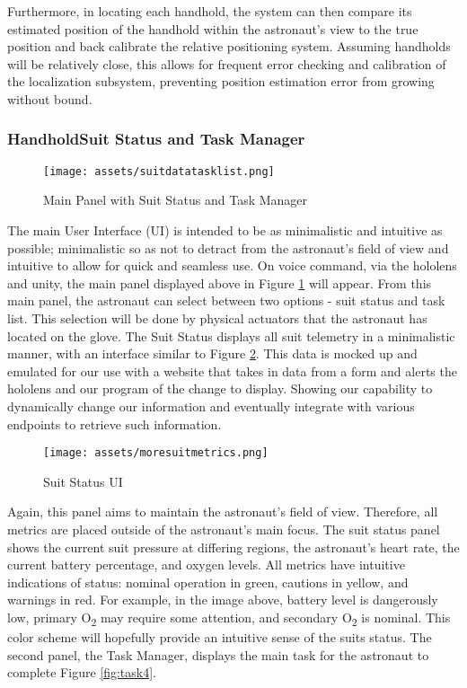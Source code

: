 \documentclass{article}
\let\Oldsubsubsection\subsubsection
\renewcommand{\subsubsection}{\FloatBarrier\Oldsubsubsection}
\begin{document}
Furthermore, in locating each handhold, the system can then compare its estimated position of the handhold within the astronaut’s view to the true position and back calibrate the relative positioning system. Assuming handholds will be relatively close, this allows for frequent error checking and calibration of the localization subsystem, preventing position estimation error from growing without bound.

\subsubsection{HandholdSuit Status and Task Manager}

\begin{figure}[!htb]
  \centering
  \texttt{[image: assets/suitdatatasklist.png]}
  \caption{Main Panel with Suit Status and Task Manager}
  \label{fig:suitdatatasklist}
\end{figure}

The main User Interface (UI) is intended to be as minimalistic and intuitive as possible; minimalistic so as not to detract from the astronaut’s field of view and intuitive to allow for quick and seamless use. On voice command, via the hololens and unity, the main panel displayed above in Figure \ref{fig:suitdatatasklist} will appear. From this main panel, the astronaut can select between two options - suit status and task list. This selection will be done by physical actuators that the astronaut has located on the glove. The Suit Status displays all suit telemetry in a minimalistic manner, with an interface similar to Figure \ref{fig:moresuitmetrics}. This data is mocked up and emulated for our use with a website that takes in data from a form and alerts the hololens and our program of the change to display. Showing our capability to dynamically change our information and eventually integrate with various endpoints to retrieve such information.

\begin{figure}[!htb]
  \centering
  \texttt{[image: assets/moresuitmetrics.png]}
  \caption{Suit Status UI}
  \label{fig:moresuitmetrics}
\end{figure}

Again, this panel aims to maintain the astronaut’s field of view. Therefore, all metrics are placed outside of the astronaut’s main focus. The suit status panel shows the current suit pressure at differing regions, the astronaut’s heart rate, the current battery percentage, and oxygen levels. All metrics have intuitive indications of status: nominal operation in green, cautions in yellow, and warnings in red. For example, in the image above, battery level is dangerously low, primary O\textsubscript{2} may require some attention, and secondary O\textsubscript{2} is nominal. This color scheme will hopefully provide an intuitive sense of the suits status. The second panel, the Task Manager, displays the main task for the astronaut to complete Figure \ref{fig:task4}.
\end{document}
